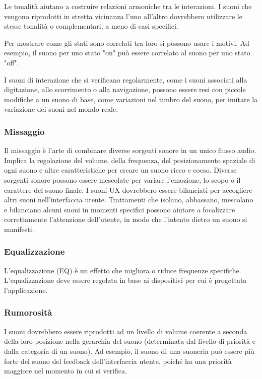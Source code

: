 \documentclass[12pt, a4paper]{report}
\begin{document}
                Le tonalità aiutano a costruire relazioni armoniche tra le interazioni. I suoni che vengono riprodotti in stretta vicinanza l'uno all'altro dovrebbero utilizzare le stesse tonalità o complementari, a meno di  casi specifici.

                Per mostrare come gli stati sono correlati tra loro si possono usare i motivi. Ad esempio, il suono per uno stato "on" può essere correlato al suono per uno stato "off".

                I suoni di interazione che si verificano regolarmente, come i suoni associati alla digitazione, allo scorrimento o alla navigazione, possono essere resi con piccole modifiche a un suono di base, come variazioni nel timbro del
                suono, per imitare la variazione dei suoni nel mondo reale.

                \subsubsection{Missaggio}
                Il missaggio è l'arte di combinare diverse sorgenti sonore in un unico flusso audio. Implica la regolazione del volume, della frequenza, del posizionamento spaziale di ogni suono e altre caratteristiche per creare un suono ricco e coeso.
                Diverse sorgenti sonore possono essere mescolate per variare l'emozione, lo scopo o il carattere del suono finale. I suoni UX dovrebbero essere bilanciati per accogliere altri suoni nell'interfaccia utente. Trattamenti che isolano, abbassano,
                mescolano e bilanciano alcuni suoni in momenti specifici possono aiutare a focalizzare correttamente l'attenzione dell'utente, in modo che l'intento dietro un suono si manifesti.

                \subsubsection{Equalizzazione}
                L'equalizzazione (EQ) è un effetto che migliora o riduce frequenze specifiche. L'equalizzazione deve essere regolata in base ai dispositivi per cui è progettata l'applicazione.

                \subsubsection{Rumorosità}
                I suoni dovrebbero essere riprodotti ad un livello di volume coerente a seconda della loro posizione nella gerarchia del suono (determinata dal livello di priorità e dalla categoria di un suono). Ad esempio, il suono di una suoneria
                può essere più forte del suono del feedback dell'interfaccia utente, poiché ha una priorità maggiore nel momento in cui si verifica.
\end{document}
